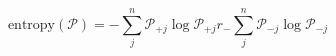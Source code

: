 \begin{equation}
\text{entropy}(\mathcal P) = -\sum_j^n\mathcal P_{+j}\log\mathcal P_{+j}r_ -\sum_j^n\mathcal P_{-j}\log\mathcal P_{-j} 
\end{equation}